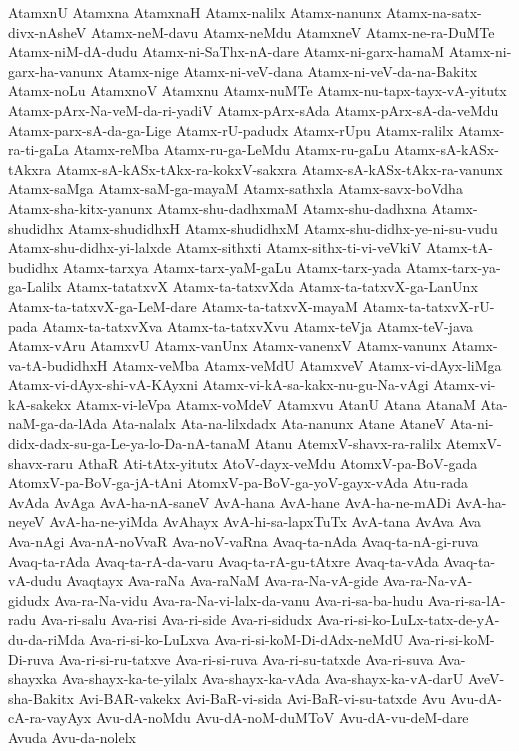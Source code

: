 {AtamxnU
Atamxna
AtamxnaH
Atamx-nalilx
Atamx-nanunx
Atamx-na-satx-divx-nAsheV
Atamx-neM-davu
Atamx-neMdu
AtamxneV
Atamx-ne-ra-DuMTe
Atamx-niM-dA-dudu
Atamx-ni-SaThx-nA-dare
Atamx-ni-garx-hamaM
Atamx-ni-garx-ha-vanunx
Atamx-nige
Atamx-ni-veV-dana
Atamx-ni-veV-da-na-Bakitx
Atamx-noLu
AtamxnoV
Atamxnu
Atamx-nuMTe
Atamx-nu-tapx-tayx-vA-yitutx
Atamx-pArx-Na-veM-da-ri-yadiV
Atamx-pArx-sAda
Atamx-pArx-sA-da-veMdu
Atamx-parx-sA-da-ga-Lige
Atamx-rU-padudx
Atamx-rUpu
Atamx-ralilx
Atamx-ra-ti-gaLa
Atamx-reMba
Atamx-ru-ga-LeMdu
Atamx-ru-gaLu
Atamx-sA-kASx-tAkxra
Atamx-sA-kASx-tAkx-ra-kokxV-sakxra
Atamx-sA-kASx-tAkx-ra-vanunx
Atamx-saMga
Atamx-saM-ga-mayaM
Atamx-sathxla
Atamx-savx-boVdha
Atamx-sha-kitx-yanunx
Atamx-shu-dadhxmaM
Atamx-shu-dadhxna
Atamx-shudidhx
Atamx-shudidhxH
Atamx-shudidhxM
Atamx-shu-didhx-ye-ni-su-vudu
Atamx-shu-didhx-yi-lalxde
Atamx-sithxti
Atamx-sithx-ti-vi-veVkiV
Atamx-tA-budidhx
Atamx-tarxya
Atamx-tarx-yaM-gaLu
Atamx-tarx-yada
Atamx-tarx-ya-ga-Lalilx
Atamx-tatatxvX
Atamx-ta-tatxvXda
Atamx-ta-tatxvX-ga-LanUnx
Atamx-ta-tatxvX-ga-LeM-dare
Atamx-ta-tatxvX-mayaM
Atamx-ta-tatxvX-rU-pada
Atamx-ta-tatxvXva
Atamx-ta-tatxvXvu
Atamx-teVja
Atamx-teV-java
Atamx-vAru
AtamxvU
Atamx-vanUnx
Atamx-vanenxV
Atamx-vanunx
Atamx-va-tA-budidhxH
Atamx-veMba
Atamx-veMdU
AtamxveV
Atamx-vi-dAyx-liMga
Atamx-vi-dAyx-shi-vA-KAyxni
Atamx-vi-kA-sa-kakx-nu-gu-Na-vAgi
Atamx-vi-kA-sakekx
Atamx-vi-leVpa
Atamx-voMdeV
Atamxvu
AtanU
Atana
AtanaM
Ata-naM-ga-da-lAda
Ata-nalalx
Ata-na-lilxdadx
Ata-nanunx
Atane
AtaneV
Ata-ni-didx-dadx-su-ga-Le-ya-lo-Da-nA-tanaM
Atanu
AtemxV-shavx-ra-ralilx
AtemxV-shavx-raru
AthaR
Ati-tAtx-yitutx
AtoV-dayx-veMdu
AtomxV-pa-BoV-gada
AtomxV-pa-BoV-ga-jA-tAni
AtomxV-pa-BoV-ga-yoV-gayx-vAda
Atu-rada
AvAda
AvAga
AvA-ha-nA-saneV
AvA-hana
AvA-hane
AvA-ha-ne-mADi
AvA-ha-neyeV
AvA-ha-ne-yiMda
AvAhayx
AvA-hi-sa-lapxTuTx
AvA-tana
AvAva
Ava
Ava-nAgi
Ava-nA-noVvaR
Ava-noV-vaRna
Avaq-ta-nAda
Avaq-ta-nA-gi-ruva
Avaq-ta-rAda
Avaq-ta-rA-da-varu
Avaq-ta-rA-gu-tAtxre
Avaq-ta-vAda
Avaq-ta-vA-dudu
Avaqtayx
Ava-raNa
Ava-raNaM
Ava-ra-Na-vA-gide
Ava-ra-Na-vA-gidudx
Ava-ra-Na-vidu
Ava-ra-Na-vi-lalx-da-vanu
Ava-ri-sa-ba-hudu
Ava-ri-sa-lA-radu
Ava-ri-salu
Ava-risi
Ava-ri-side
Ava-ri-sidudx
Ava-ri-si-ko-LuLx-tatx-de-yA-du-da-riMda
Ava-ri-si-ko-LuLxva
Ava-ri-si-koM-Di-dAdx-neMdU
Ava-ri-si-koM-Di-ruva
Ava-ri-si-ru-tatxve
Ava-ri-si-ruva
Ava-ri-su-tatxde
Ava-ri-suva
Ava-shayxka
Ava-shayx-ka-te-yilalx
Ava-shayx-ka-vAda
Ava-shayx-ka-vA-darU
AveV-sha-Bakitx
Avi-BAR-vakekx
Avi-BaR-vi-sida
Avi-BaR-vi-su-tatxde
Avu
Avu-dA-cA-ra-vayAyx
Avu-dA-noMdu
Avu-dA-noM-duMToV
Avu-dA-vu-deM-dare
Avuda
Avu-da-nolelx
}
